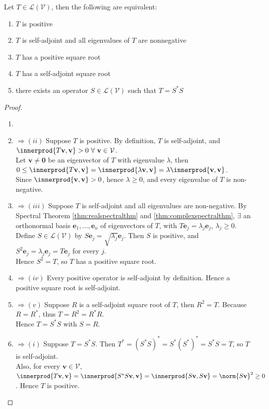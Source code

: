 \begin{theorem} \label{thm:positiveopcharacterisation} Let $T \in \mathcal{L}(\mathcal{V})$, then the following are equivalent:
\begin{enumerate}[label=\roman*.]
\setlength{\itemsep}{0pt}
\item $T$ is positive
\item $T$ is self-adjoint and all eigenvalues of $T$ are nonnegative
\item $T$ has a positive square root
\item $T$ has a self-adjoint square root
\item there exists an operator $S \in \mathcal{L}(\mathcal{V})$ such that $T = S^* S$
\end{enumerate}
\begin{proof}
\begin{enumerate}[label=\roman*.]
\setlength{\itemsep}{0pt}
\item[]
\item[$(i)$]$\Rightarrow (ii)$ Suppose $T$ is positive. By definition, $T$ is self-adjoint, and $\innerprod{T \mathbf{v}, \mathbf{v}} > 0 \ \forall \ \mathbf{v} \in \mathcal{V}$.\\
Let $\mathbf{v} \neq \mathbf{0}$ be an eigenvector of $T$ with eigenvalue $\lambda$, then $0 \leq \innerprod{T \mathbf{v}, \mathbf{v}} = \innerprod{\lambda \mathbf{v}, \mathbf{v}} = \lambda \innerprod{\mathbf{v}, \mathbf{v}}$.\\
Since $\innerprod{\mathbf{v}, \mathbf{v}} > 0$, hence $\lambda \geq 0$, and every eigenvalue of $T$ is non-negative.
\item[$(ii)$]$\Rightarrow (iii)$ Suppose $T$ is self-adjoint and all eigenvalues are non-negative. By Spectral Theorem \ref{thm:realspectralthm} and \ref{thm:complexspectralthm}, $\exists$ an orthonormal basis $\mathbf{e}_1, \ldots, \mathbf{e}_n$ of eigenvectors of $T$, with $T \mathbf{e}_j = \lambda_j \mathbf{e}_j$, $\lambda_j \geq 0$. Define $S \in \mathcal{L}(\mathcal{V})$ by $S \mathbf{e}_j = \sqrt{\lambda_j} \mathbf{e}_j$. Then $S$ is positive, and $S^2 \mathbf{e}_j = \lambda_j \mathbf{e}_j = T \mathbf{e}_j$ for every $j$.\\
Hence $S^2 = T$, so $T$ has a positive square root.
\item[$(iii)$]$\Rightarrow (iv)$ Every positive operator is self-adjoint by definition. Hence a positive square root is self-adjoint.
\item[$(iv)$]$\Rightarrow (v)$ Suppose $R$ is a self-adjoint square root of $T$, then $R^2 = T$. Because $R = R^*$, thus $T = R^2 = R^* R$.\\
Hence $T = S^* S$ with $S = R$.
\item[$(v)$]$\Rightarrow (i)$ Suppose $T = S^* S$. Then $T^* = (S^* S)^* = S^* (S^*)^* = S^* S = T$, so $T$ is self-adjoint.\\
Also, for every $\mathbf{v} \in \mathcal{V}$, $\innerprod{T \mathbf{v}, \mathbf{v}} = \innerprod{S^* S \mathbf{v}, \mathbf{v}} = \innerprod{S \mathbf{v}, S \mathbf{v}} = \norm{S \mathbf{v}}^2 \geq 0$. Hence $T$ is positive.
\end{enumerate}
\end{proof}
\end{theorem}

